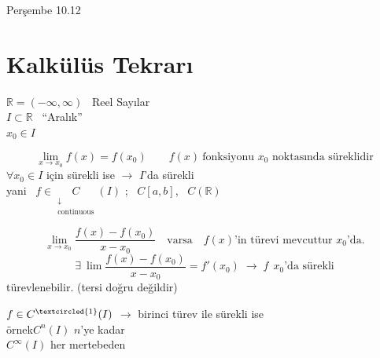 \documentclass[11pt,a4paper]{article}
\begin{document}

{\small\color{kursunkalem}Perşembe 10.12}

\section{Kalkülüs Tekrarı}

\noindent
\begin{minipage}[c]{0.5\linewidth}
$\mathbb{R} = (-\infty, \infty)$ \ Reel Sayılar\\
$I \subset \mathbb{R}$ \ ``Aralık''\\
\hspace*{1em}$x_0 \in I$
\end{minipage}\hfill
\begin{minipage}[c]{0.45\linewidth}
\centering
{}
\end{minipage}

\[
  \lim_{x\to x_0} f(x) = f(x_0) \qquad f(x)\ \text{fonksiyonu } x_0 \text{ noktasında süreklidir}
\]
$\forall x_0 \in I$ için sürekli ise $\rightarrow$ $I$'da sürekli\\
yani \ $f \in \underset{\substack{\downarrow\\ \text{continuous}}}{C}(I)$ \quad ; \ $C[a,b]$, \ $C(\mathbb{R})$

\[
  \lim_{x\to x_0} \frac{f(x) - f(x_0)}{x - x_0} \quad \text{varsa} \quad f(x)\text{'in türevi mevcuttur } x_0\text{'da.}
\]
\[
  \exists\ \lim \frac{f(x) - f(x_0)}{x - x_0} = f'(x_0) \;\rightarrow\; f\ \ x_0\text{'da sürekli}
\]
\hspace*{0.4\linewidth}türevlenebilir. \quad (tersi doğru değildir)

\medskip
\noindent $f \in C^{\textcircled{\scriptsize 1}}(I)$ \quad $\rightarrow$ birinci türev ile sürekli ise\\
{\scriptsize örnek}\quad $C^{n}(I)$ \quad $n$'ye kadar\\
\hspace*{3.2em}$C^{\infty}(I)$ \quad her mertebeden
\end{document}

